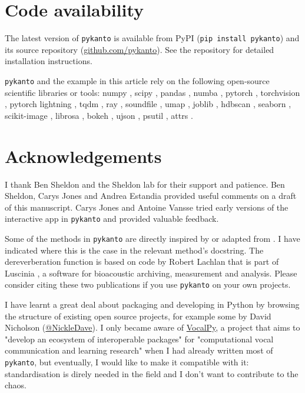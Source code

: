 \section{Code availability}

The latest version of \texttt{pykanto} is available from PyPI (\texttt{pip install
pykanto}) and its source repository (\href{https://github.com/nilomr/pykanto}{github.com/pykanto}). See the repository for detailed installation instructions.

\noindent \texttt{pykanto} and the example in this article rely on the following open-source scientific
libraries or tools: numpy \parencite{numpy2020}, scipy \parencite{scipy2020}, pandas
\parencite{pandas2023}, numba \parencite{lam2015}, pytorch \parencite{pytorch2019},
torchvision \parencite{torchvision2016}, pytorch lightning
\parencite{pytorchlightning2019}, tqdm \parencite{tqdm2019}, ray \parencite{moritz2018},
soundfile \parencite{bechtold2022}, umap \parencite{mcinnes2018},  joblib
\parencite{joblib2020}, hdbscan \parencite{mcinnes2017}, seaborn \parencite{Waskom2021},
scikit-image \parencite{scikitimage2014}, librosa \parencite{mcfee2015}, bokeh
\parencite{bokeh2018}, ujson \parencite{ujason2023}, psutil \parencite{psutil2023}, attrs
\parencite{schlawack2019}.

\section{Acknowledgements}

I thank Ben Sheldon and the Sheldon lab for their support and
patience. Ben Sheldon, Carys Jones and Andrea Estandia provided useful comments on a draft of this
manuscript. Carys Jones and Antoine Vansse tried early versions of the
interactive app in \texttt{pykanto} and provided valuable feedback.

Some of the methods in \texttt{pykanto} are directly inspired by or adapted
from \cite{sainburg2020}. I have indicated where
this is the case in the relevant method's docstring. The dereverberation
function is based on code by Robert Lachlan that is part of Luscinia
\parencite{lachlan2016a}, a software for bioacoustic archiving, measurement and
analysis. Please consider citing these two publications if you use
\texttt{pykanto} on your own projects.

I have learnt a great deal about packaging and developing in Python by browsing
the structure of existing open source projects, for example some by David
Nicholson (\href{https://github.com/NickleDave/NickleDave}{@NickleDave}). I only
became aware of \href{https://github.com/vocalpy}{VocalPy}, a project that aims
to "develop an ecosystem of interoperable packages" for
"computational vocal communication and learning research" when I had
already written most of \texttt{pykanto}, but eventually, I would like to make it
compatible with it: standardisation is direly needed in the field and I don't
want to contribute to the chaos.


